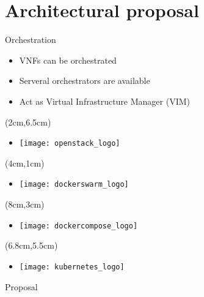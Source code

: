 \section{Architectural proposal}
\begin{frame}{Orchestration}
  \begin{itemize}
  \item<1-> VNFs can be orchestrated
  \item<2-> Serveral orchestrators are available
  \item<7-> Act as Virtual Infrastructure Manager (VIM)
  \end{itemize}

  \begin{textblock*}{5cm}(2cm,6.5cm)
    \begin{itemize}
    \item[]<3-> \texttt{[image: openstack\_logo]}
    \end{itemize}
  \end{textblock*}

  \begin{textblock*}{5cm}(4cm,1cm)
    \begin{itemize}
    \item[]<4-> \texttt{[image: dockerswarm\_logo]}
    \end{itemize}
  \end{textblock*}

  \begin{textblock*}{5cm}(8cm,3cm)
    \begin{itemize}
    \item[]<5-> \texttt{[image: dockercompose\_logo]}
    \end{itemize}
  \end{textblock*}

  \begin{textblock*}{5cm}(6.8cm,5.5cm)
    \begin{itemize}
    \item[]<6-> \texttt{[image: kubernetes\_logo]}
    \end{itemize}
  \end{textblock*}
\end{frame}

\begin{frame}{Proposal}

\end{frame}
